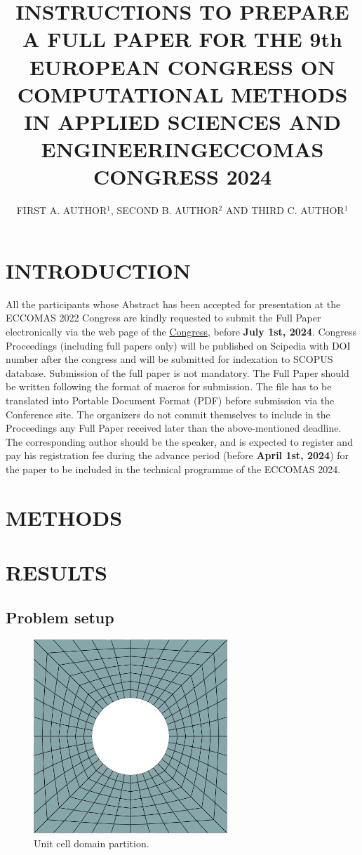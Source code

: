 \documentclass[a4paper]{eccomas_paper-2024}
\title{INSTRUCTIONS TO PREPARE A FULL PAPER FOR THE 9th EUROPEAN CONGRESS ON COMPUTATIONAL METHODS IN APPLIED SCIENCES AND ENGINEERING\break ECCOMAS CONGRESS 2024}
\author{FIRST A. AUTHOR$^1$, SECOND B. AUTHOR$^2$ AND THIRD C. AUTHOR$^1$}
\begin{document}
\thispagestyle{empty}

\section{INTRODUCTION}

All the participants whose Abstract has been accepted for presentation at the ECCOMAS 2022 Congress are kindly requested to submit the Full Paper electronically via the web page of the \href{https://eccomas2024.org/lisbon}{Congress}, before \textbf{July 1st, 2024}. Congress Proceedings (including full papers only) will be published on Scipedia with DOI number after the congress and will be submitted for indexation to SCOPUS database. Submission of the full paper is not mandatory. The Full Paper should be written following the format of macros for submission. The file has to be translated into Portable Document Format (PDF) before submission via the Conference site. The organizers do not commit themselves to include in the Proceedings any Full Paper received later than the above-mentioned deadline. The corresponding author should be the speaker, and is expected to register and pay his registration fee during the advance period (before \textbf{April 1st, 2024}) for the paper to be included in the technical programme of the ECCOMAS 2024.

\section{METHODS}

\section{RESULTS}

\subsection{Problem setup}

\begin{figure}
    \begin{center}
        \includegraphics[width=0.65\textwidth]{../figures/beam/unit_cell.png}
    \end{center}
    \caption{Unit cell domain partition.}\label{fig:unit_cell_domain}
\end{figure}
\end{document}
